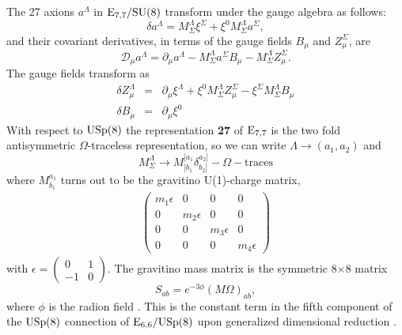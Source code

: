 \documentclass[a4paper,12pt]{article}
\begin{document}
The 27 axions $a^\Lambda$ in $\mathrm{E}_{7,7}/\mathrm{SU}(8)$ transform
 under the gauge algebra as follows:
$$\delta a^\Lambda=M^\Lambda_\Sigma\xi^\Sigma+\xi^0M_\Sigma^\Lambda a^\Sigma,$$
and their covariant derivatives, in terms of the gauge fields $B_\mu$ and $Z^\Sigma_\mu$, are
$$\mathcal{D}_\mu a^\Lambda=\partial_\mu a^\Lambda- M_\Sigma^\Lambda a^\Sigma B_\mu
-M_\Sigma^\Lambda Z^\Sigma_\mu.$$
The gauge fields transform as
\begin{eqnarray*}
\delta Z_\mu^\Lambda&=&\partial_\mu\xi^\Lambda+\xi^0M_\Sigma^\Lambda Z^\Sigma_\mu-\xi^\Sigma
M_\Sigma^\Lambda B_\mu\\
\delta B_\mu&=&\partial_\mu\xi^0
\end{eqnarray*}
With respect to $\mathrm{USp}(8)$ the representation {\bf 27} of $\mathrm{E}_{7,7}$ is the two fold
antisymmetric $\Omega$-traceless representation, so we can write $\Lambda\rightarrow
(a_1,a_2)$ and
$$M^\Lambda_\Sigma \rightarrow
M^{[a_1}_{[b_1}\delta_{b_2]}^{a_2]}-\Omega\!\!-\!\!\mathrm{traces}$$ where $M_{b_1}^{a_1}$
turns out to be the gravitino U(1)-charge matrix,
\begin{eqnarray}\begin{pmatrix}m_1\epsilon&0&0&0\\0&m_2\epsilon&0&0\\0&0&m_3\epsilon&0\\0&0&0&m_4
\epsilon
\end{pmatrix}\label{matrix}\end{eqnarray}
with $\epsilon=\begin{pmatrix}0&1\\-1&0\end{pmatrix}$.
The gravitino  mass matrix is the symmetric 8$\times$8 matrix
$$S_{ab}=e^{-3\phi}(M\Omega)_{ab},$$
where $\phi$ is the radion field \cite{adfl2,adfl3}. This is the constant term  in the fifth
component of the $\mathrm{USp}(8)$ connection of $\mathrm{E}_{6,6}/\mathrm{USp}(8)$ upon generalized dimensional
reduction \cite{svn}.
\end{document}
